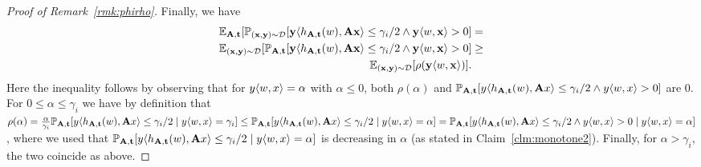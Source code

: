 \begin{proof}[Proof of Remark~\ref{rmk:phirho}]
Finally, we have
\begin{align*}
\mathbb{E}_{\mathbf{A},\mathbf{t}} [\mathbb{P}_{(\mathbf{x},\mathbf{y}) \sim \mathcal{D}}[\mathbf{y} \langle h_{\mathbf{A},\mathbf{t}}(w), \mathbf{A} \mathbf{x}\rangle \leq \gamma_i/2 \wedge \mathbf{y} \langle w, \mathbf{x}\rangle > 0] &= \\
\mathbb{E}_{(\mathbf{x},\mathbf{y}) \sim \mathcal{D}} [\mathbb{P}_{\mathbf{A},\mathbf{t}}[\mathbf{y} \langle h_{\mathbf{A},\mathbf{t}}(w), \mathbf{A} \mathbf{x}\rangle \leq \gamma_i/2 \wedge \mathbf{y} \langle w, \mathbf{x}\rangle > 0] &\geq \\
\mathbb{E}_{(\mathbf{x}, \mathbf{y}) \sim \mathcal{D}}[\rho(\mathbf{y}\langle w, \mathbf{x} \rangle)].
\end{align*}
Here the inequality follows by observing that for $y\langle w,x\rangle = \alpha$ with $\alpha \leq 0$, both $\rho(\alpha)$ and $\mathbb{P}_{\mathbf{A},\mathbf{t}}[y \langle h_{\mathbf{A},\mathbf{t}}(w), \mathbf{A} x\rangle \leq \gamma_i/2 \wedge y \langle w, x\rangle > 0]$ are $0$. For $0 \leq \alpha \leq \gamma_i$ we have by definition that $\rho(\alpha) = \tfrac{\alpha}{\gamma_i} \mathbb{P}_{\mathbf{A},\mathbf{t}}[y\langle h_{\mathbf{A},\mathbf{t}}(w),\mathbf{A} x\rangle \leq \gamma_i/2 \mid y\langle w,x\rangle = \gamma_i] \leq \mathbb{P}_{\mathbf{A},\mathbf{t}}[y\langle h_{\mathbf{A},\mathbf{t}}(w),\mathbf{A} x\rangle \leq \gamma_i/2 \mid y\langle w,x\rangle = \alpha] = \mathbb{P}_{\mathbf{A},\mathbf{t}}[y\langle h_{\mathbf{A},\mathbf{t}}(w),\mathbf{A} x\rangle \leq \gamma_i/2 \wedge y \langle w,x\rangle>0 \mid y\langle w,x\rangle = \alpha]$, where we used that $\mathbb{P}_{\mathbf{A},\mathbf{t}}[y\langle h_{\mathbf{A},\mathbf{t}}(w),\mathbf{A} x\rangle \leq \gamma_i/2 \mid y\langle w,x\rangle = \alpha]$ is decreasing in $\alpha$ (as stated in Claim~\ref{clm:monotone2}). Finally, for $\alpha > \gamma_i$, the two coincide as above.
\end{proof}


